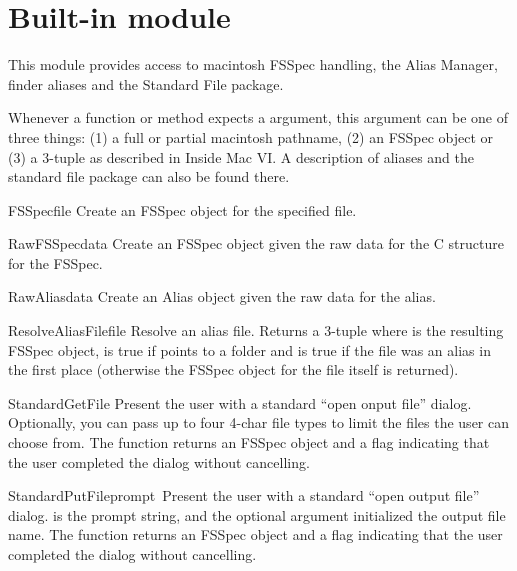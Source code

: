 \section{Built-in module }

\renewcommand{\indexsubitem}{(in module macfs)}

This module provides access to macintosh FSSpec handling, the Alias
Manager, finder aliases and the Standard File package.

Whenever a function or method expects a  argument, this
argument can be one of three things: (1) a full or partial macintosh
pathname, (2) an FSSpec object or (3) a 3-tuple  as described in Inside Mac VI. A description of aliases
and the standard file package can also be found there.

\begin{funcdesc}{FSSpec}{file}
Create an FSSpec object for the specified file.
\end{funcdesc}

\begin{funcdesc}{RawFSSpec}{data}
Create an FSSpec object given the raw data for the C structure for the
FSSpec.
\end{funcdesc}

\begin{funcdesc}{RawAlias}{data}
Create an Alias object given the raw data for the alias.
\end{funcdesc}

\begin{funcdesc}{ResolveAliasFile}{file}
Resolve an alias file. Returns a 3-tuple  where  is the resulting FSSpec object,
 is true if  points to a folder and
 is true if the file was an alias in the first place
(otherwise the FSSpec object for the file itself is returned).
\end{funcdesc}

\begin{funcdesc}{StandardGetFile}{}
Present the user with a standard ``open onput file''
dialog. Optionally, you can pass up to four 4-char file types to limit
the files the user can choose from. The function returns an FSSpec
object and a flag indicating that the user completed the dialog
without cancelling.
\end{funcdesc}

\begin{funcdesc}{StandardPutFile}{prompt\, }
Present the user with a standard ``open output file''
dialog.  is the prompt string, and the optional
 argument initialized the output file name. The function
returns an FSSpec object and a flag indicating that the user completed
the dialog without cancelling.
\end{funcdesc}

